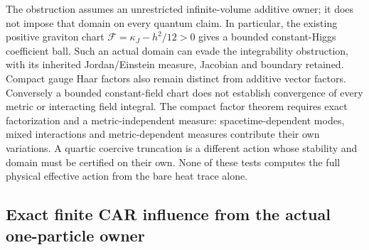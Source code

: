 \documentclass[12pt,a4paper]{article}
\begin{document}
\begin{remark}
\label{p4:rem:v2216-finite-heat-domain}
The obstruction assumes an unrestricted infinite-volume additive owner;
it does not impose that domain on every quantum claim. In particular,
the existing positive graviton chart
$\mathscr F=\kappa_J-h^2/12>0$ gives a bounded constant-Higgs
coefficient ball. Such an actual domain can evade the integrability
obstruction, with its inherited Jordan/Einstein measure, Jacobian and
boundary retained. Compact gauge Haar factors also remain distinct from
additive vector factors. Conversely a bounded constant-field chart does
not establish convergence of every metric or interacting field integral.
The compact factor theorem requires exact factorization and a
metric-independent measure: spacetime-dependent modes, mixed interactions
and metric-dependent measures contribute their own variations. A quartic
coercive truncation is a different action whose stability and domain must
be certified on their own. None of these tests computes the full physical
effective action from the bare heat trace alone.
\end{remark}



\subsection{Exact finite CAR influence from the actual one-particle owner}
\label{p3f:sec:v247-car-influence-determinant}
\end{document}
